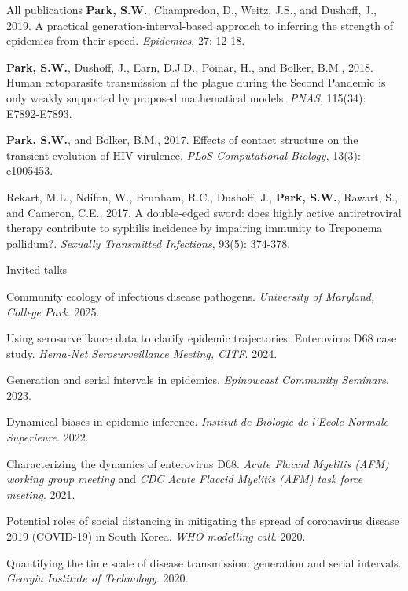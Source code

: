 \documentclass[
	11pt, %
]{resume} %
\begin{document}
\begin{rSection}{All publications}
\textbf{Park, S.W.}, Champredon, D., Weitz, J.S., and Dushoff, J., 2019. A practical generation-interval-based approach to inferring the strength of epidemics from their speed. \textit{Epidemics}, 27: 12-18.

\textbf{Park, S.W.}, Dushoff, J., Earn, D.J.D., Poinar, H., and Bolker, B.M., 2018. Human ectoparasite transmission of the plague during the Second Pandemic is only weakly supported by proposed mathematical models. \textit{PNAS}, 115(34): E7892-E7893.

\textbf{Park, S.W.}, and Bolker, B.M., 2017. Effects of contact structure on the transient evolution of HIV virulence. \textit{PLoS Computational Biology}, 13(3): e1005453.

Rekart, M.L., Ndifon, W., Brunham, R.C., Dushoff, J., \textbf{Park, S.W.}, Rawart, S., and Cameron, C.E., 2017. A double-edged sword: does highly active antiretroviral therapy contribute to syphilis incidence by impairing immunity to Treponema pallidum?. \textit{Sexually Transmitted Infections}, 93(5): 374-378.

\end{rSection}

\begin{rSection}{Invited talks}

Community ecology of infectious disease pathogens. \textit{University of Maryland, College Park}. 2025.

Using serosurveillance data to clarify epidemic trajectories: Enterovirus D68 case study. \textit{Hema-Net Serosurveillance Meeting, CITF}. 2024.

Generation and serial intervals in epidemics. \textit{Epinowcast Community Seminars}. 2023.

Dynamical biases in epidemic inference. \textit{Institut de Biologie de l'Ecole Normale Superieure}. 2022.

Characterizing the dynamics of enterovirus D68. \textit{Acute Flaccid Myelitis (AFM) working group meeting} and \textit{CDC Acute Flaccid Myelitis (AFM) task force meeting}. 2021.

Potential roles of social distancing in mitigating the spread of coronavirus disease 2019 (COVID-19) in South Korea. \textit{WHO modelling call}. 2020.

Quantifying the time scale of disease transmission: generation and serial intervals. \textit{Georgia Institute of Technology}. 2020.

\end{rSection}
\end{document}
